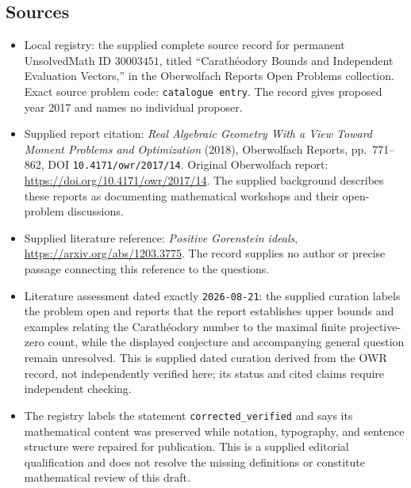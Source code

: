 \documentclass[11pt]{article}
\begin{document}
\subsection{Sources}
\begin{itemize}
\item Local registry: the supplied complete source record for permanent UnsolvedMath ID \(30003451\), titled ``Carath\'{e}odory Bounds and Independent Evaluation Vectors,'' in the Oberwolfach Reports Open Problems collection. Exact source problem code: \texttt{catalogue entry}. The record gives proposed year 2017 and names no individual proposer.
\item Supplied report citation: \emph{Real Algebraic Geometry With a View Toward Moment Problems and Optimization} (2018), Oberwolfach Reports, pp.\ 771--862, DOI \texttt{10.4171/owr/2017/14}. Original Oberwolfach report: \url{https://doi.org/10.4171/owr/2017/14}. The supplied background describes these reports as documenting mathematical workshops and their open-problem discussions.
\item Supplied literature reference: \emph{Positive Gorenstein ideals}, \url{https://arxiv.org/abs/1203.3775}. The record supplies no author or precise passage connecting this reference to the questions.
\item Literature assessment dated exactly \texttt{2026-08-21}: the supplied curation labels the problem open and reports that the report establishes upper bounds and examples relating the Carath\'{e}odory number to the maximal finite projective-zero count, while the displayed conjecture and accompanying general question remain unresolved. This is supplied dated curation derived from the OWR record, not independently verified here; its status and cited claims require independent checking.
\item The registry labels the statement \texttt{corrected\_verified} and says its mathematical content was preserved while notation, typography, and sentence structure were repaired for publication. This is a supplied editorial qualification and does not resolve the missing definitions or constitute mathematical review of this draft.
\end{itemize}
\end{document}
